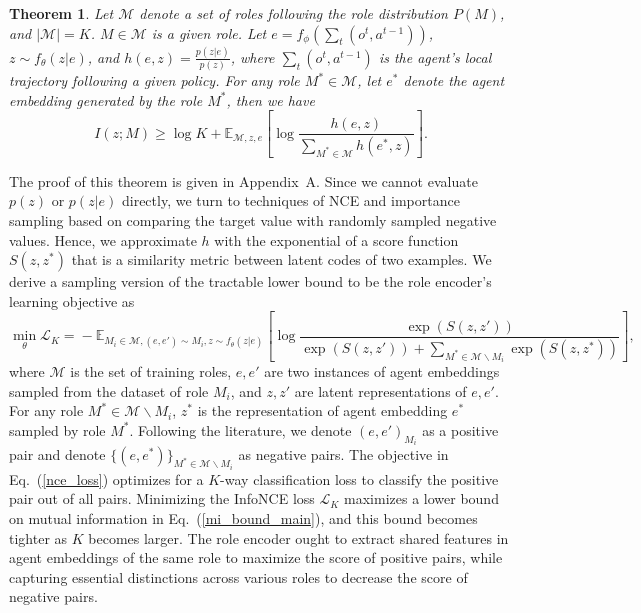 \documentclass{article} %
\newtheorem{theorem}{Theorem}
\begin{document}
\begin{theorem}
    Let $\mathcal{M}$ denote a set of roles following the role distribution $P(M)$, and $|\mathcal{M}|\!=\!K$.
    $M\!\in\! \mathcal{M}$ is a given role.
    Let $e\!=\!f_{\phi}(\sum_t (o^t,a^{t-1}))$, $z\!\sim\! f_{\theta}(z|e)$, and $h(e,z)\!=\!\frac{p(z|e)}{p(z)}$, where $\sum_t(o^t,a^{t-1})$ is the agent's local trajectory following a given policy.
    For any role $M^*\!\in\!\mathcal{M}$, let $e^*$ denote the agent embedding generated by the role $M^*$, then we have
    \begin{equation}
        I(z; M) \ge \log K +  \mathbb{E}_{\mathcal{M},z,e}\left[\log\frac{h(e,z)}{\sum_{M^*\in\mathcal{M}}h(e^*,z)}\right].
        \label{mi_bound_main}
    \end{equation}
\end{theorem}

The proof of this theorem is given in Appendix~A.
Since we cannot evaluate $p(z)$ or $p(z|e)$ directly, we turn to techniques of NCE and importance sampling based on comparing the target value with randomly sampled negative values.
Hence, we approximate $h$ with the exponential of a score function $S(z, z^*)$ that is a similarity metric between latent codes of two examples.
We derive a sampling version of the tractable lower bound to be the role encoder's learning objective as
\begin{equation}
    \min_{\theta}\mathcal{L}_K \!= \!- \mathbb{E}_{M_i\in\mathcal{M}, (e,e')\sim M_i, z\sim f_{\theta}(z|e)} \!\!\left[ \log \frac{\exp (S(z,z'))}{\exp (S(z,z')) + \sum_{M^*\in\mathcal{M}\backslash M_i}\exp(S(z,z^*))} \right]\!\!,
    \label{nce_loss}
\end{equation}
where $\mathcal{M}$ is the set of training roles, $e,e'$ are two instances of agent embeddings sampled from the dataset of role $M_i$, and $z,z'$ are latent representations of $e,e'$. 
For any role $M^*\!\in\!\mathcal{M}\backslash M_i$, $z^*$ is the representation of agent embedding $e^*$ sampled by role $M^*$.
Following the literature, we denote $(e,e')_{M_i}$ as a positive pair and denote $\{(e,e^*)\}_{M^*\in\mathcal{M}\backslash M_i}$ as negative pairs.
The objective in Eq.~(\ref{nce_loss}) optimizes for a $K$-way classification loss to classify the positive pair out of all pairs.
Minimizing the InfoNCE loss $\mathcal{L}_K$ maximizes a lower bound on mutual information in Eq.~(\ref{mi_bound_main}), and this bound becomes tighter as $K$ becomes larger.
The role encoder ought to extract shared features in agent embeddings of the same role to maximize the score of positive pairs, while capturing essential distinctions across various roles to decrease the score of negative pairs.
\end{document}
